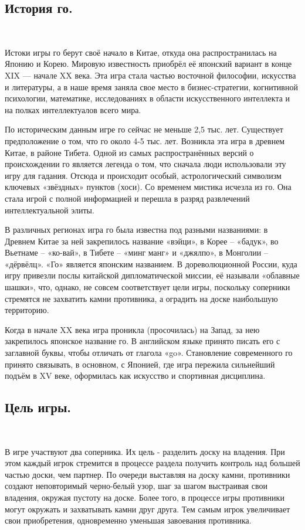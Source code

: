 \documentclass[14pt,a4paper]{extarticle}
\begin{document}
\subsection*{История го.}
\

Истоки игры го берут своё начало в Китае, откуда она распространилась на Японию и Корею. Мировую известность приобрёл её японский вариант в конце XIX — начале XX века. Эта игра стала частью восточной философии, искусства и литературы, а в наше время заняла свое место в бизнес-стратегии, когнитивной психологии, математике, исследованиях в области искусственного интеллекта и на полках интеллектуалов всего мира.

По историческим данным игре го сейчас не меньше 2,5 тыс. лет. Существует предположение о том, что го около 4-5 тыс. лет. Возникла эта игра в древнем Китае, в районе Тибета. Одной из самых распространённых версий о происхождении го является легенда о том, что сначала люди использовали эту игру для гадания. Отсюда и происходит особый, астрологический символизм ключевых «звёздных» пунктов (хоси). Со временем мистика исчезла из го. Она стала игрой с полной информацией и перешла в разряд развлечений интеллектуальной элиты.

В различных регионах игра го была известна под разными названиями: в Древнем Китае за ней закрепилось название «вэйци», в Корее – «бадук», во Вьетнаме – «ко-вай», в Тибете – «минг манг» и «джялпо», в Монголии – «дёрвёлц». «Го» является японским названием. В дореволюционной России, куда игру привезли послы китайской дипломатической миссии, её называли «облавные шашки», что, однако, не совсем соответствует цели игры, поскольку соперники стремятся не захватить камни противника, а оградить на доске наибольшую территорию. 

Когда в начале XX века игра проникла (просочилась) на Запад, за нею закрепилось японское название го. В английском языке принято писать его с заглавной буквы, чтобы отличать от глагола «go». Становление современного го принято связывать, в основном, с Японией, где игра пережила сильнейший подъём в XV веке, оформилась как искусство и спортивная дисциплина.

\subsection*{Цель игры.}
\ 

В игре участвуют два соперника. Их цель - разделить доску на владения. При этом каждый игрок стремится в процессе раздела получить контроль над большей частью доски, чем партнер. По очереди выставляя на доску камни, противники создают неповторимый черно-белый узор, шаг за шагом выстраивая свои владения, окружая пустоту на доске. Более того, в процессе игры противники могут окружать и захватывать камни друг друга. Тем самым игрок увеличивает свои приобретения, одновременно уменьшая завоевания противника.
\end{document}
